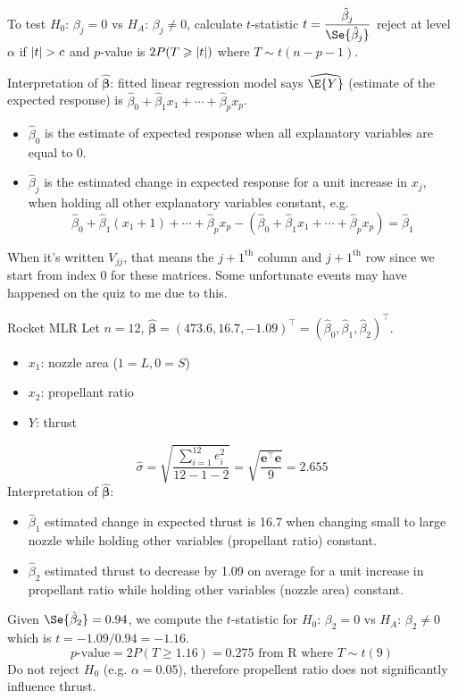To test $ H_0 $: $ \beta_j=0 $ vs $ H_A $: $ \beta_j\neq 0 $,
calculate $ t $-statistic
$ t=\dfrac{\hat{\beta}_j}{\Se{\hat{\beta}_j}} $
reject at level $ \alpha $ if $ \lvert t\rvert>c $ and
$ p $-value is $ 2P(T\geqslant \lvert t\rvert) $ where $ T \sim t(n-p-1) $.

Interpretation of $ \hat{\symbf{\beta}} $: fitted linear
regression model says $ \widehat{\E{Y}} $
(estimate of the expected response) is
$ \hat{\beta}_0+\hat{\beta}_1x_1+\cdots+\hat{\beta}_p x_p $.
\begin{itemize}
    \item $ \hat{\beta}_0 $ is the estimate of expected response
          when all explanatory variables are equal to 0.
    \item $ \hat{\beta}_j $ is the estimated change
          in expected response for a unit increase in $ x_j $,
          when holding all other explanatory variables constant,
          e.g.\
          \[ \hat{\beta}_0+\hat{\beta}_1(x_1+1)+\cdots+\hat{\beta}_p x_p
              -(\hat{\beta}_0+\hat{\beta}_1 x_1+\cdots+\hat{\beta}_p x_p)=\hat{\beta}_1 \]
\end{itemize}

\begin{Remark}{}{}
    When it's written $ V_{jj} $, that means the $ j+1^{\text{th}} $
    column and $ j+1^{\text{th}} $ row since we start from index $ 0 $
    for these matrices. Some unfortunate events may have happened
    on the quiz to me due to this.
\end{Remark}

\begin{Example}{Rocket MLR}{}
    Let $ n=12 $, $ \hat{\symbf{\beta}}=(473.6, 16.7,-1.09)^\top
        =(\hat{\beta}_0,\hat{\beta}_1,\hat{\beta}_2)^\top $.
    \begin{itemize}
        \item $ x_1 $: nozzle area ($ 1 = L,0=S $)
        \item $ x_2 $: propellant ratio
        \item $ Y $: thrust
    \end{itemize}
    \[ \hat{\sigma}=\sqrt{\frac{\sum\limits_{i=1}^{12} e_i^2}{12-1-2}}=
        \sqrt{\frac{\symbf{e}^\top \symbf{e}}{9}}=
        2.655 \]
    Interpretation of $ \hat{\symbf{\beta}} $:
    \begin{itemize}
        \item $ \hat{\beta}_1 $ estimated change in expected thrust is 16.7
              when changing small to large nozzle while holding other variables
              (propellant ratio) constant.
        \item $ \hat{\beta}_2 $ estimated thrust to decrease by 1.09 on average
              for a unit increase in propellant ratio while holding other
              variables (nozzle area) constant.
    \end{itemize}
    Given $ \Se{\hat{\beta}_2}=0.94 $,
    we compute the $ t $-statistic for $ H_0 $: $ \beta_2=0 $ vs $ H_A $: $ \beta_2\neq 0 $
    which is $ t=-1.09/0.94=-1.16 $.
    \[ p\text{-value}=2P(T\geqslant 1.16)=0.275\text{ from R where } T \sim t(9)\]
    Do not reject $ H_0 $ (e.g. $ \alpha=0.05 $), therefore
    propellent ratio does not significantly influence thrust.
\end{Example}
